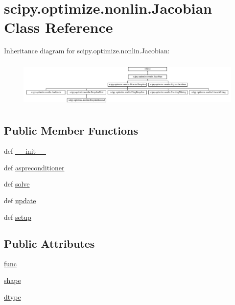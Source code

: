 \hypertarget{classscipy_1_1optimize_1_1nonlin_1_1Jacobian}{}\section{scipy.\+optimize.\+nonlin.\+Jacobian Class Reference}
\label{classscipy_1_1optimize_1_1nonlin_1_1Jacobian}
Inheritance diagram for scipy.\+optimize.\+nonlin.\+Jacobian\+:\begin{figure}[H]
\begin{center}
\leavevmode
\includegraphics[height=2.393162cm]{classscipy_1_1optimize_1_1nonlin_1_1Jacobian}
\end{center}
\end{figure}
\subsection*{Public Member Functions}
\begin{DoxyCompactItemize}
\item 
def \hyperlink{classscipy_1_1optimize_1_1nonlin_1_1Jacobian_ab0e4a39d35a1b341c120843fa415bd93}{\+\_\+\+\_\+init\+\_\+\+\_\+}
\item 
def \hyperlink{classscipy_1_1optimize_1_1nonlin_1_1Jacobian_a4e2eaa54402ecb02e0ecbcb79d99cc2f}{aspreconditioner}
\item 
def \hyperlink{classscipy_1_1optimize_1_1nonlin_1_1Jacobian_a32d16eb28918ec782956d557a720514a}{solve}
\item 
def \hyperlink{classscipy_1_1optimize_1_1nonlin_1_1Jacobian_aec88e611895b09e34d5a1e13aa92173e}{update}
\item 
def \hyperlink{classscipy_1_1optimize_1_1nonlin_1_1Jacobian_ac6b95be0fb2e639686890759c94cb6f6}{setup}
\end{DoxyCompactItemize}
\subsection*{Public Attributes}
\begin{DoxyCompactItemize}
\item 
\hyperlink{classscipy_1_1optimize_1_1nonlin_1_1Jacobian_acf4b293f7d8114567d69b61b4cd11b8c}{func}
\item 
\hyperlink{classscipy_1_1optimize_1_1nonlin_1_1Jacobian_a399bcc4bdec38649979fb903ec3c509a}{shape}
\item 
\hyperlink{classscipy_1_1optimize_1_1nonlin_1_1Jacobian_ae928f7098e2435baf8380e3148c679cc}{dtype}
\end{DoxyCompactItemize}


